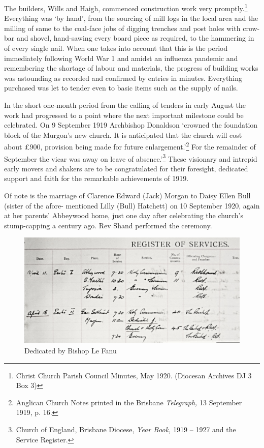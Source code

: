 The builders, Wills and Haigh, commenced construction work very
promptly.\footnote{Christ Church Parish Council Minutes, May 1920.
  (Diocesan Archives DJ 3 Box 3)} Everything was `by hand', from the
sourcing of mill logs in the local area and the milling of same to the
coal-face jobs of digging trenches and post holes with crow-bar and
shovel, hand-sawing every board piece as required, to the hammering in
of every single nail. When one takes into account that this is the
period immediately following World War 1 and amidst an influenza
pandemic and remembering the shortage of labour and materials, the
progress of building works was astounding as recorded and confirmed by
entries in minutes. Everything purchased was let to tender even to basic
items such as the supply of nails.

In the short one-month period from the calling of tenders in early
August the work had progressed to a point where the next important
milestone could be celebrated. On 9 September 1919 Archbishop Donaldson
`crowned the foundation block of the Murgon's new church. It is
anticipated that the church will cost about \pounds900, provision being made
for future enlargement.'\footnote{Anglican Church Notes printed in the
  Brisbane \emph{Telegraph,} 13 September 1919, p. 16.} For the
remainder of September the vicar was away on leave of
absence.'\footnote{Church of England, Brisbane Diocese, \emph{Year
  Book,} 1919 -- 1927 and the Service Register.} These visionary and
intrepid early movers and shakers are to be congratulated for their
foresight, dedicated support and faith for the remarkable achievements
of 1919.

Of note is the marriage of Clarence Edward (Jack) Morgan to Daisy Ellen
Bull (sister of the afore- mentioned Lilly (Bull) Hatchett) on 10
September 1920, again at her parents' Abbeywood home, just one day after
celebrating the church's stump-capping a century ago. Rev Shand
performed the ceremony.




\begin{figure}[!h]
\begin{center}
\includegraphics[width=1.0\textwidth,center]{images/dedicationByBishopLeFanu.jpg}
\caption{Dedicated by Bishop Le Fanu}
\end{center}
\end{figure}


